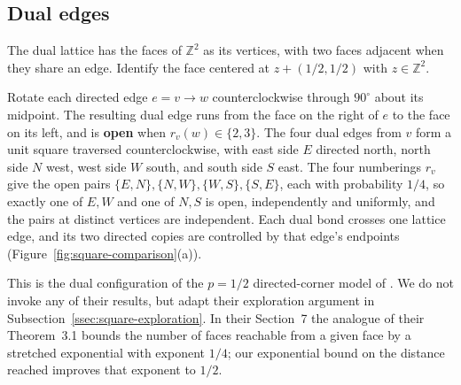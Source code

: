 \documentclass[11pt]{amsart}
\theoremstyle{plain}
\theoremstyle{definition}
\newcommand{\Z}{\mathbb Z}
\newcommand{\defn}[1]{\textbf{#1}}
\begin{document}
	\subsection{Dual edges}\label{ssec:faces}
	
	The dual lattice has the faces of $\Z^2$ as its vertices, with two faces
	adjacent when they share an edge.  Identify the face centered at
	$z+(1/2,1/2)$ with $z\in\Z^2$.
	
	Rotate each directed edge $e=v\to w$ counterclockwise through $90^\circ$ about
	its midpoint.  The resulting dual edge runs from the face on the right of $e$
	to the face on its left, and is \defn{open} when $r_v(w)\in\{2,3\}$.  The four
	dual edges from $v$ form a unit square traversed counterclockwise, with east
	side $E$ directed north, north side $N$ west, west side $W$ south, and south
	side $S$ east.  The four numberings $r_v$ give the open pairs
	$\{E,N\},\{N,W\},\{W,S\},\{S,E\}$, each with probability $1/4$, so exactly one
	of $E,W$ and one of $N,S$ is open, independently and uniformly, and the pairs
	at distinct vertices are independent.  Each dual bond crosses one lattice edge,
	and its two directed copies are controlled by that edge's endpoints
	(Figure~\ref{fig:square-comparison}\textup{(a)}).
	
	This is the dual configuration of the $p=1/2$ directed-corner model of
	\citet*[Section~7]{CoupierHenryJahnelKoppl2024}. We do not invoke any of their results, 
	but adapt their exploration argument in
	Subsection~\ref{ssec:square-exploration}.  In their Section~7 the analogue of
	their Theorem~3.1 bounds the number of faces reachable from a given face by a
	stretched exponential with exponent $1/4$; our exponential bound on the
	distance reached improves that exponent to $1/2$.
	
\end{document}
